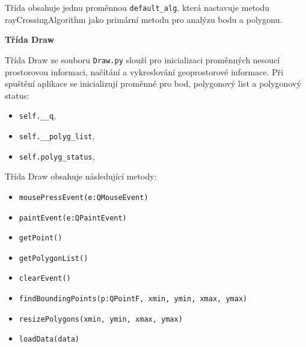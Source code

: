 \par Třída obsahuje jednu proměnnou \verb|default_alg|, která nastavuje metodu rayCrossingAlgorithm jako primární metodu pro analýzu bodu a polygonu.

\bigbreak

\par {\large\textbf{Třída Draw} }
\par Třída Draw ze souboru \verb|Draw.py| slouží pro inicializaci proměnných nesoucí prostorovou informaci, načítání a vykreslování geoprostorové informace. Při spuštění aplikace se inicializují proměnné pro bod, polygonový list a polygonový status:

\begin{itemize}
  \item \verb|self.__q|,
  \item \verb|self.__polyg_list|,
  \item \verb|self.polyg_status|,
\end{itemize}

\par Třída Draw obsahuje následující metody:
\begin{itemize}
    \item \verb|mousePressEvent(e:QMouseEvent)|
    \item \verb|paintEvent(e:QPaintEvent)|
    \item \verb|getPoint()|
    \item \verb|getPolygonList()|
    \item \verb|clearEvent()|
    \item \verb|findBoundingPoints(p:QPointF, xmin, ymin, xmax, ymax)|
    \item \verb|resizePolygons(xmin, ymin, xmax, ymax)|
    \item \verb|loadData(data)|
\end{itemize}
